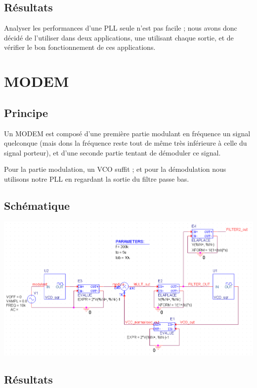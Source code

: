\documentclass{article}
\begin{document}
\subsection{Résultats}

Analyser les performances d’une PLL seule n’est pas facile ; nous avons donc décidé de l’utiliser dans deux applications, une utilisant chaque sortie, et de vérifier le bon fonctionnement de ces applications.

\section{MODEM}

\subsection{Principe}

Un MODEM est composé d’une première partie modulant en fréquence un signal quelconque (mais dons la fréquence reste tout de même très inférieure à celle du signal porteur), et d’une seconde partie tentant de démoduler ce signal.

Pour la partie modulation, un VCO suffit ; et pour la démodulation nous utilisons notre PLL en regardant la sortie du filtre passe bas.

\subsection{Schématique}

\includegraphics[width=\linewidth]{modem_sch.png}

\subsection{Résultats}
\end{document}
